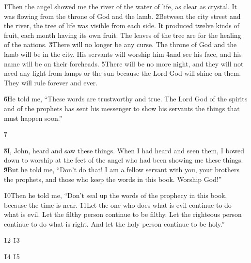\v{1}Then the angel showed me the river of the water of life, as clear as crystal. It was flowing from the throne of God and the lamb. \v{2}Between the city street and the river, the tree of life was visible from each side. It produced twelve kinds of fruit, each month having its own fruit. The leaves of the tree are for the healing of the nations. \v{3}There will no longer be any curse. The throne of God and the lamb will be in the city. His servants will worship him \v{4}and see his face, and his name will be on their foreheads. \v{5}There will be no more night, and they will not need any light from lamps or the sun because the Lord God will shine on them. They will rule forever and ever.

\v{6}He told me, ``These words are trustworthy and true. The Lord God of the spirits and of the prophets has sent his messenger to show his servants the things that must happen soon.''

\v{7}

\v{8}I, John, heard and saw these things. When I had heard and seen them, I bowed down to worship at the feet of the angel who had been showing me these things. \v{9}But he told me, ``Don't do that! I am a fellow servant with you, your brothers the prophets, and those who keep the words in this book. Worship God!''

\v{10}Then he told me, ``Don't seal up the words of the prophecy in this book, because the time is near. \v{11}Let the one who does what is evil continue to do what is evil. Let the filthy person continue to be filthy. Let the righteous person continue to do what is right. And let the holy person continue to be holy.''

\v{12} \v{13}

\v{14} \v{15}

